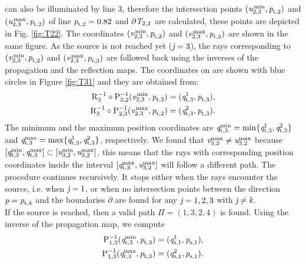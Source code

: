 \indent  {} can also be illuminated by line $3$, therefore the intersection points $(\textit{u}_{2, 3}^\textrm{\,min}, \textit{p}_{\textrm{t,} \textit{$2$}})$ and $(\textit{u}_{2, 3}^\textrm{\,max}, \textit{p}_{\textrm{t,} \textit{$2$}})$ of line
 $\textit{p}_{\textrm{t,} \textit{$2$}}=0.82$ and $\partial \mbox{$\emph{T}_{\textit{$2$,$3$}}$}$ are calculated, these points are depicted in Fig. \ref{fig:T22}.
 The coordinates $(\textit{v}_{2, 3}^\textrm{\,min}, \textit{p}_{\textrm{t,} \textit{$2$}})$ and $(\textit{v}_{2, 3}^\textrm{\,max}, \textit{p}_{\textrm{t,} \textit{$2$}})$ are shown in the same figure.
 As the source is not reached yet ($\textit{j}=3$), the rays corresponding to $(\textit{v}_{2, 3}^\textrm{\,min}, \textit{p}_{\textrm{t,} \textit{$2$}})$ and $(\textit{v}_{2, 3}^\textrm{\,max}, \textit{p}_{\textrm{t,} \textit{$2$}})$ are followed back using the inverses of the propagation and the reflection maps. The coordinates on  are shown  with blue circles in Figure \ref{fig:T31} and they are obtained from:
 \begin{equation}
\begin{split}
\mathrm{R}_{{3}}^{-1}\circ \mathrm{P}_{{3,2}}^{-1}(\textit{v}_{2, 3}^\textrm{\,min}, \textit{p}_{\textrm{t,} \textit{$2$}}) &= (\textit{q}_{\textrm{t,} \textit{$3$}}^{1}, \textit{p}_{\textrm{t,} \textit{$3$}}),\\
\mathrm{R}_{{3}}^{-1}\circ \mathrm{P}_{{2,3}}^{-1}(\textit{v}_{2, 3}^\textrm{\,max}, \textit{p}_{\textrm{t,} \textit{$2$}}) &= (\textit{q}_{\textrm{t,} \textit{$3$}}^{2}, \textit{p}_{\textrm{t,} \textit{$3$}}).
\end{split}
\end{equation}
The minimum and the maximum position coordinates are $\textit{q}_{\textrm{t,} \textit{$3$}}^{\textrm{min}}= \min\{\textit{q}_{\textrm{t,} \textit{$3$}}^{1}, \textit{q}_{\textrm{t,} \textit{$3$}}^{2}\}$ and 
$\textit{q}_{\textrm{t,} \textit{$3$}}^{\textrm{max}}= \max\{\textit{q}_{\textrm{t,} \textit{$3$}}^{1}, \textit{q}_{\textrm{t,} \textit{$3$}}^{2}\}$, respectively.
We found that $\textit{v}_{3,2}^\textrm{max}\neq\textit{u}_{3,2}^\textrm{max}$ because $[\textit{q}_{\textrm{t,} \textit{$3$}}^\textrm{min}, \textit{q}_{\textrm{t,} \textit{$3$}}^\textrm{max}]\subset
[\textit{u}_{3,2}^\textrm{min},\textit{u}_{3,2}^\textrm{max}]$, this means that the rays with corresponding position coordinates inside the interval 
$[\textit{q}_{\textrm{t,} \textit{$3$}}^\textrm{max},\textit{u}_{3,2}^\textrm{max}]$ will follow a different path. 
The procedure continues recursively.
  It stops either when the rays encounter the source, i.e. when $\textit{j}=1$, or when no intersection points between the
  direction $\textit{p}=\textit{p}_{\textrm{t,} \textit{\textit{k}}}$ and the boundaries $\partial$ are found for any $\textit{j}={1,2,3}$ with $\textit{j}\neq\textit{k}$. \\ \indent
  If the source is reached, then a valid path $\Pi = (1,3,2,4)$ is found. Using the inverse of the propagation map, we compute
\begin{equation}
\begin{aligned}
\mathrm{P}_{{1,3}}^{-1}(\textit{q}_{\textrm{t,} \textit{$3$}}^\textrm{min}, \textit{p}_{\textrm{t,} \textit{$3$}}) = (\textit{q}_{\textrm{s,} \textit{$1$}}^1, \textit{p}_{\textrm{s,} \textit{$1$}}), \\ 
\mathrm{P}_{{1,3}}^{-1}(\textit{q}_{\textrm{t,} \textit{$3$}}^\textrm{max}, \textit{p}_{\textrm{t,} \textit{$3$}}) = (\textit{q}_{\textrm{s,} \textit{$1$}}^2, \textit{p}_{\textrm{s,} \textit{$1$}}).
 \end{aligned}
\end{equation} 
